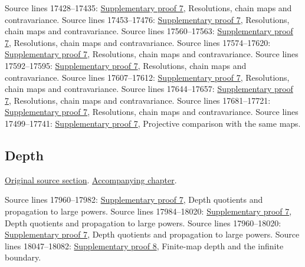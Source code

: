 \begin{AlgebraSourceRoutes}
 Source lines 17428--17435: \hyperlink{algebra_blowup_ext_depth_notes_20260927}{Supplementary proof 7}, Resolutions, chain maps and contravariance.
 Source lines 17453--17476: \hyperlink{algebra_blowup_ext_depth_notes_20260927}{Supplementary proof 7}, Resolutions, chain maps and contravariance.
 Source lines 17560--17563: \hyperlink{algebra_blowup_ext_depth_notes_20260927}{Supplementary proof 7}, Resolutions, chain maps and contravariance.
 Source lines 17574--17620: \hyperlink{algebra_blowup_ext_depth_notes_20260927}{Supplementary proof 7}, Resolutions, chain maps and contravariance.
 Source lines 17592--17595: \hyperlink{algebra_blowup_ext_depth_notes_20260927}{Supplementary proof 7}, Resolutions, chain maps and contravariance.
 Source lines 17607--17612: \hyperlink{algebra_blowup_ext_depth_notes_20260927}{Supplementary proof 7}, Resolutions, chain maps and contravariance.
 Source lines 17644--17657: \hyperlink{algebra_blowup_ext_depth_notes_20260927}{Supplementary proof 7}, Resolutions, chain maps and contravariance.
 Source lines 17681--17721: \hyperlink{algebra_blowup_ext_depth_notes_20260927}{Supplementary proof 7}, Resolutions, chain maps and contravariance.
 Source lines 17499--17741: \hyperlink{algebra_blowup_ext_depth_notes_20260927}{Supplementary proof 7}, Projective comparison with the same maps.
\end{AlgebraSourceRoutes}

\subsection{Depth}
\hypertarget{algebra-source-section-depth}{}
\noindent\href{https://github.com/stacks/stacks-project/blob/a04446e57ec1fbc252a871afcec7752fb2807b14/algebra.tex\#L17759}{Original source section}. \href{algebra.pdf\#nameddest=section-depth}{Accompanying chapter}.

\begin{AlgebraSourceRoutes}
 Source lines 17960--17982: \hyperlink{algebra_blowup_ext_depth_notes_20260927}{Supplementary proof 7}, Depth quotients and propagation to large powers.
 Source lines 17984--18020: \hyperlink{algebra_blowup_ext_depth_notes_20260927}{Supplementary proof 7}, Depth quotients and propagation to large powers.
 Source lines 17960--18020: \hyperlink{algebra_blowup_ext_depth_notes_20260927}{Supplementary proof 7}, Depth quotients and propagation to large powers.
 Source lines 18047--18082: \hyperlink{algebra_depth_tor_projective_notes_20260927}{Supplementary proof 8}, Finite-map depth and the infinite boundary.
\end{AlgebraSourceRoutes}

